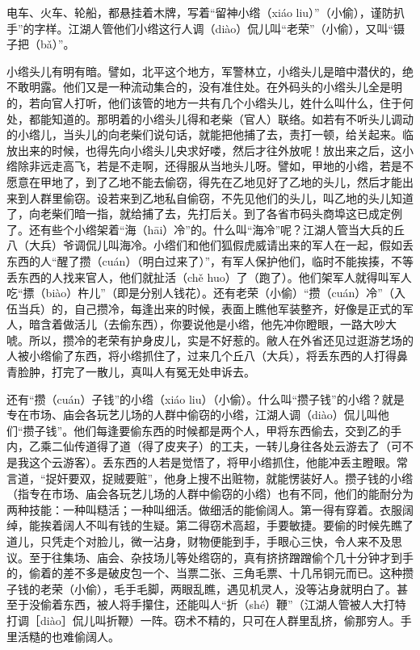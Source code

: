 \documentclass[12pt,UTF8]{ctexbook}
\begin{document}
电车、火车、轮船，都悬挂着木牌，写着“留神小绺（xiáo liu）”（小偷），谨防扒手”的字样。江湖人管他们小绺这行人调（diào）侃儿叫“老荣”（小偷），又叫“镊子把（bǎ）”。



小绺头儿有明有暗。譬如，北平这个地方，军警林立，小绺头儿是暗中潜伏的，绝不敢明露。他们又是一种流动集合的，没有准住处。在外码头的小绺头儿全是明的，若向官人打听，他们该管的地方一共有几个小绺头儿，姓什么叫什么，住于何处，都能知道的。那明着的小绺头儿得和老柴（官人）联络。如若有不听头儿调动的小绺儿，当头儿的向老柴们说句话，就能把他捕了去，责打一顿，给关起来。临放出来的时候，也得先向小绺头儿央求好喽，然后才往外放呢！放出来之后，这小绺除非远走高飞，若是不走啊，还得服从当地头儿呀。譬如，甲地的小绺，若是不愿意在甲地了，到了乙地不能去偷窃，得先在乙地见好了乙地的头儿，然后才能出来到人群里偷窃。设若来到乙地私自偷窃，不先见他们的头儿，叫乙地的头儿知道了，向老柴们暗一指，就给捕了去，先打后关。到了各省市码头商埠这已成定例了。还有些个小绺架着“海（hāi）冷”的。什么叫“海冷”呢？江湖人管当大兵的丘八（大兵）爷调侃儿叫海冷。小绺们和他们狐假虎威请出来的军人在一起，假如丢东西的人“醒了攒（cuán）（明白过来了）”，有军人保护他们，临时不能挨揍，不等丢东西的人找来官人，他们就扯活（chě huo）了（跑了）。他们架军人就得叫军人吃“摽（biào）杵儿”（即是分别人钱花）。还有老荣（小偷）“攒（cuán）冷”（入伍当兵）的，自己攒冷，每逢出来的时候，表面上瞧他军装整齐，好像是正式的军人，暗含着做活儿（去偷东西），你要说他是小绺，他先冲你瞪眼，一路大吵大唬。所以，攒冷的老荣有护身皮儿，实是不好惹的。敝人在外省还见过逛游艺场的人被小绺偷了东西，将小绺抓住了，过来几个丘八（大兵），将丢东西的人打得鼻青脸肿，打完了一散儿，真叫人有冤无处申诉去。

还有“攒（cuán）子钱”的小绺（xiáo liu）（小偷）。什么叫“攒子钱”的小绺？就是专在市场、庙会各玩艺儿场的人群中偷窃的小绺，江湖人调（diào）侃儿叫他们“攒子钱”。他们每逢要偷东西的时候都是两个人，甲将东西偷去，交到乙的手内，乙乘二仙传道得了道（得了皮夹子）的工夫，一转儿身往各处云游去了（可不是我这个云游客）。丢东西的人若是觉悟了，将甲小绺抓住，他能冲丢主瞪眼。常言道，“捉奸要双，捉贼要赃”，他身上搜不出赃物，就能愣装好人。攒子钱的小绺（指专在市场、庙会各玩艺儿场的人群中偷窃的小绺）也有不同，他们的能耐分为两种技能：一种叫糙活；一种叫细活。做细活的能偷阔人。第一得有穿着。衣服阔绰，能挨着阔人不叫有钱的生疑。第二得窃术高超，手要敏捷。要偷的时候先瞧了道儿，只凭走个对脸儿，微一沾身，财物便能到手，手眼心三快，令人来不及思议。至于往集场、庙会、杂技场儿等处绺窃的，真有挤挤蹭蹭偷个几十分钟才到手的，偷着的差不多是破皮包一个、当票二张、三角毛票、十几吊铜元而已。这种攒子钱的老荣（小偷），毛手毛脚，两眼乱瞧，遇见机灵人，没等沾身就明白了。甚至于没偷着东西，被人将手攥住，还能叫人“折（shé）鞭”（江湖人管被人大打特打调［diào］侃儿叫折鞭）一阵。窃术不精的，只可在人群里乱挤，偷那穷人。手里活糙的也难偷阔人。
\end{document}
